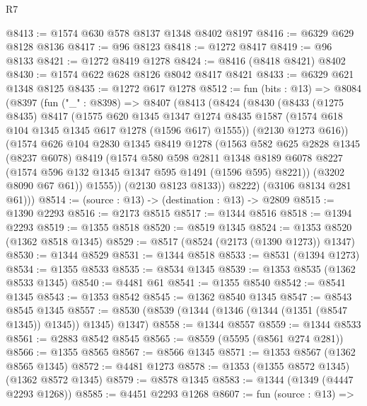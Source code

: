 \begin{lexlean}{R7}
\begin{coremodule}
@8413 := @1574 @630 @578 @8137 @1348 @8402 @8197
@8416 := @6329 @629 @8128 @8136
@8417 := @96 @8123
@8418 := @1272 @8417
@8419 := @96 @8133
@8421 := @1272 @8419 @1278
@8424 := @8416 (@8418 @8421) @8402
@8430 := @1574 @622 @628 @8126 @8042 @8417 @8421
@8433 := @6329 @621 @1348 @8125
@8435 := @1272 @617 @1278
@8512 := fun (bits : @13) =>
  @8084
    (@8397
      (fun ("_" : @8398) =>
      @8407
        (@8413
          (@8424
            (@8430
              (@8433
                (@1275 @8435)
                @8417
                (@1575
                  @620
                  @1345
                  @1347
                  @1274
                  @8435
                  @1587
                  (@1574 @618 @104 @1345 @1345 @617 @1278 (@1596 @617) @1555))
                (@2130 @1273 @616))
              (@1574
                @626
                @104
                @2830
                @1345
                @8419
                @1278
                (@1563
                  @582
                  @625
                  @2828
                  @1345
                  (@8237 @6078)
                  @8419
                  (@1574
                    @580
                    @598
                    @2811
                    @1348
                    @8189
                    @6078
                    @8227
                    (@1574 @596 @132 @1345 @1347 @595 @1491 (@1596 @595) @8221))
                  (@3202 @8090 @67 @61))
                @1555))
            (@2130 @8123 @8133))
          @8222)
        (@3106 @8134 @281 @61)))
@8514 := (source : @13) -> (destination : @13) -> @2809
@8515 := @1390 @2293
@8516 := @2173 @8515
@8517 := @1344 @8516
@8518 := @1394 @2293
@8519 := @1355 @8518
@8520 := @8519 @1345
@8524 := @1353 @8520 (@1362 @8518 @1345)
@8529 := @8517 (@8524 (@2173 (@1390 @1273)) @1347)
@8530 := @1344 @8529
@8531 := @1344 @8518
@8533 := @8531 (@1394 @1273)
@8534 := @1355 @8533
@8535 := @8534 @1345
@8539 := @1353 @8535 (@1362 @8533 @1345)
@8540 := @4481 @61
@8541 := @1355 @8540
@8542 := @8541 @1345
@8543 := @1353 @8542
@8545 := @1362 @8540 @1345
@8547 := @8543 @8545 @1345
@8557 := @8530 (@8539 (@1344 (@1346 (@1344 (@1351 (@8547 @1345)) @1345)) @1345) @1347)
@8558 := @1344 @8557
@8559 := @1344 @8533
@8561 := @2883 @8542 @8545
@8565 := @8559 (@5595 (@8561 @274 @281))
@8566 := @1355 @8565
@8567 := @8566 @1345
@8571 := @1353 @8567 (@1362 @8565 @1345)
@8572 := @4481 @1273
@8578 := @1353 (@1355 @8572 @1345) (@1362 @8572 @1345)
@8579 := @8578 @1345
@8583 := @1344 (@1349 (@4447 @2293 @1268))
@8585 := @4451 @2293 @1268
@8607 := fun (source : @13) =>

\end{coremodule}
\end{lexlean}
